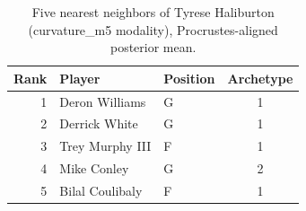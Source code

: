 \begin{table}[htbp]
  \centering\small
  \begin{tabular}{rllc}
    \toprule
    Rank & Player & Position & Archetype \\
    \midrule
    1 & Deron Williams & G & 1 \\
    2 & Derrick White & G & 1 \\
    3 & Trey Murphy III & F & 1 \\
    4 & Mike Conley & G & 2 \\
    5 & Bilal Coulibaly & F & 1 \\
    \bottomrule
  \end{tabular}
  \caption{Five nearest neighbors of Tyrese Haliburton (curvature_m5 modality), Procrustes-aligned posterior mean.}
  \label{tab:Tyrese_Haliburton_neighbors_curvature_m5}
\end{table}

